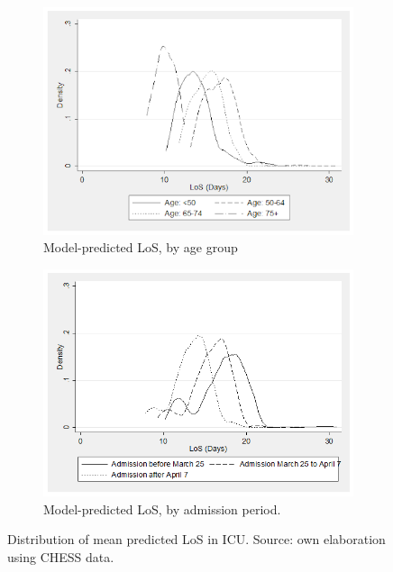 \documentclass[review]{elsarticle}
\begin{document}
\begin{figure}[!htb]
    \centering
    \begin{subfigure}[b]{0.85\textwidth}
            \centering
            \includegraphics[width=\textwidth]{LOS_age.png}
    \caption{ Model-predicted LoS, by age group} \label{fig:fig1a}
    \end{subfigure}
\begin{subfigure}[b]{0.85\textwidth}
            \centering
            \includegraphics[width=\textwidth]{LOS_period.png}
    \caption{Model-predicted LoS, by admission period.}
    \label{fig:fig1b}
    \end{subfigure}
    \caption{\protect  Distribution of mean predicted LoS in ICU. Source: own elaboration using CHESS data.}
\end{figure}
\end{document}
